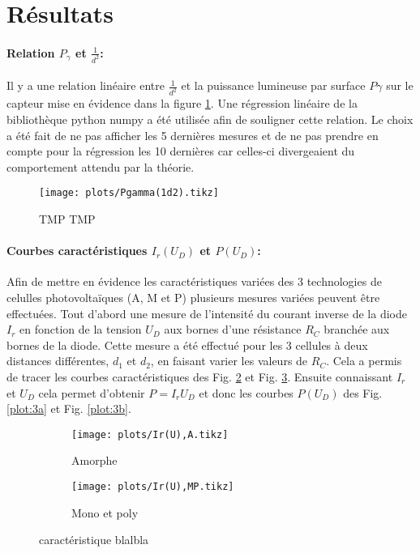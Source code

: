 \section{Résultats}

\paragraph*{Relation \(P_\gamma\) et \(\frac{1}{d^2}\):}
Il y a une relation linéaire entre \(\frac{1}{d^2}\) et la puissance lumineuse par surface \(P\gamma\) sur le capteur mise en évidence dans la figure \ref{plot:1}. Une régression linéaire de la bibliothèque python numpy a été utilisée afin de souligner cette relation.
Le choix a été fait de ne pas afficher les 5 dernières mesures et de ne pas prendre en compte pour la régression les 10 dernières car celles-ci divergeaient du comportement attendu par la théorie.

\begin{figure}[h]
    \centering
    \texttt{[image: plots/Pgamma(1d2).tikz]}
    \caption{TMP TMP}
    \label{plot:1}
\end{figure}

\paragraph*{Courbes caractéristiques \(I_r(U_D)\) et \(P(U_D)\):}
Afin de mettre en évidence les caractéristiques variées des 3 technologies de celulles photovoltaïques (A, M et P) plusieurs mesures variées peuvent être effectuées.
Tout d'abord une mesure de l'intensité du courant inverse de la diode \(I_r\) en fonction de la tension \(U_D\) aux bornes d'une résistance \(R_C\) branchée aux bornes de la diode.
Cette mesure a été effectué pour les 3 cellules à deux distances différentes, \(d_1\) et \(d_2\), en faisant varier les valeurs de \(R_C\). Cela a permis de tracer les courbes caractéristiques des Fig. \ref{plot:2a} et Fig. \ref{plot:2b}.
Ensuite connaissant \(I_r\) et \(U_D\) cela permet d'obtenir \(P = I_r U_D\) et donc les courbes \(P(U_D)\) des Fig. \ref{plot:3a} et Fig. \ref{plot:3b}.

\begin{figure}
    \centering
    \begin{subfigure}[c]{0.4\linewidth}
        \centering
        \texttt{[image: plots/Ir(U),A.tikz]}
        \caption{Amorphe}
        \label{plot:2a}
    \end{subfigure}
    \begin{subfigure}[c]{0.4\linewidth}
        \centering
        \texttt{[image: plots/Ir(U),MP.tikz]}
        \caption{Mono et poly}
        \label{plot:2b}
    \end{subfigure}
    \caption{caractéristique blalbla}
    \label{plot:2}
\end{figure}

